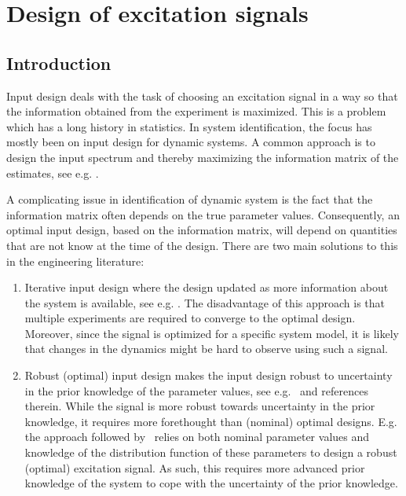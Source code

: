 \chapter{Design of excitation signals}
\label{sec:excitation}
\def\thisDir{ch02-qlogms}

\section{Introduction}
\label{sec:excitation:intro}
Input design deals with the task of choosing an excitation signal in a way so that the information obtained from the experiment is maximized. 
This is a problem which has a long history in statistics. 
In system identification, the focus has mostly been on input design for dynamic systems.
A common approach is to design the input spectrum and thereby maximizing the information matrix of the estimates, see e.g. \citep{Fedorov1972,Goodwin1977}.

A complicating issue in identification of dynamic system is the fact that the information matrix often depends on the true parameter values. 
Consequently, an optimal input design, based on the information matrix, will depend on quantities that are not know at the time of the design.
There are two main solutions to this in the engineering literature:
\begin{enumerate}
\item Iterative input design where the design updated as more information about the system is available, see e.g. \citep{Hjalmarsson2005,Gevers2005}.
The disadvantage of this approach is that multiple experiments are required to converge to the optimal design.
Moreover, since the signal is optimized for a specific system model, it is likely that changes in the dynamics might be hard to observe using such a signal.

\item Robust (optimal) input design makes the input design robust to uncertainty in the prior knowledge of the parameter values, see e.g.~\citep{Rojas2007} and references therein. 
While the signal is more robust towards uncertainty in the prior knowledge, it requires more forethought than (nominal) optimal designs.
E.g. the approach followed by~\citet{Rojas2007} relies on both nominal parameter values and  knowledge of the distribution function of these parameters to design a robust (optimal) excitation signal.
As such, this requires more advanced prior knowledge of the system to cope with the uncertainty of the prior knowledge.
\end{enumerate}

